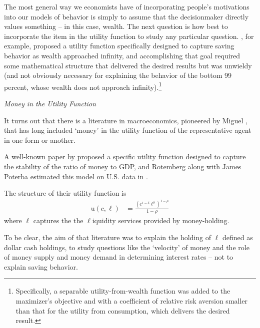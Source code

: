 \documentclass{article}
\newcommand{\CRRA}{\rho}
\newcommand{\uFunc}{\mathrm{u}}
\newcommand{\cNrm}{c}
\newcommand{\lqdt}{\ell}
\begin{document}

The most general way we economists have of incorporating people's motivations into our models of behavior is simply to assume that the decisionmaker directly values something -- in this case, wealth. The next question is how best to incorporate the item in the utility function to study any particular question.  \cite{WhyDoTheRich}, for example, proposed a utility function specifically designed to capture saving behavior as wealth approached infinity, and accomplishing that goal required some mathematical structure that delivered the desired results but was unwieldy (and not obviously necessary for explaining the behavior of the bottom 99 percent, whose wealth does not approach infinity).\footnote{Specifically, a separable utility-from-wealth function was added to the maximizer's objective and with a coefficient of relative risk aversion smaller than that for the utility from consumption, which delivers the desired result.}

\textit{Money in the Utility Function}

It turns out that there is a literature in macroeconomics, pioneered by Miguel \cite{sidrauski1967rational}, that has long included `money' in the utility function of the representative agent in one form or another.

A well-known paper by \cite{Rotemberg_1984} proposed a specific utility function designed to capture the stability of the ratio of money to GDP, and Rotemberg along with James Poterba estimated this model on U.S. data in \cite{Poterba_1986}.

The structure of their utility function is
\begin{align}
    \uFunc(\cNrm,\lqdt) & = \frac{\left(
        \cNrm^{1-\delta}\lqdt^{\delta}
        \right)^{1-\CRRA}}{1-\CRRA}
\end{align}
where $\lqdt$ captures the the $\lqdt$iquidity services provided by money-holding.

To be clear, the aim of that literature was to explain the holding of $\lqdt$ defined as dollar cash holdings, to study questions like the `velocity' of money and the role of money supply and money demand in determining interest rates -- not to explain saving behavior.
\end{document}
